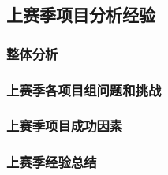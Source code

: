\subsection{上赛季项目分析经验}

    \subsubsection{整体分析}

    \subsubsection{上赛季各项目组问题和挑战}

    \subsubsection{上赛季项目成功因素}

    \subsubsection{上赛季经验总结}